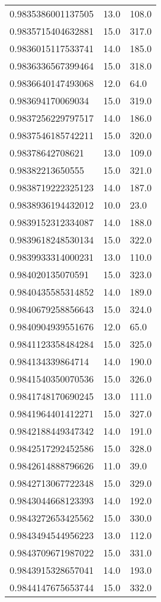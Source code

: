 \begin{center}
\begin{supertabular}[H]{p{0.30\textwidth}p{0.05\textwidth}p{0.05\textwidth}}
0.9835386001137505 & 13.0 & 108.0 \\ 
0.9835715404632881 & 15.0 & 317.0 \\ 
0.9836015117533741 & 14.0 & 185.0 \\ 
0.9836336567399464 & 15.0 & 318.0 \\ 
0.9836640147493068 & 12.0 & 64.0 \\ 
0.983694170069034 & 15.0 & 319.0 \\ 
0.9837256229797517 & 14.0 & 186.0 \\ 
0.9837546185742211 & 15.0 & 320.0 \\ 
0.98378642708621 & 13.0 & 109.0 \\ 
0.98382213650555 & 15.0 & 321.0 \\ 
0.9838719222325123 & 14.0 & 187.0 \\ 
0.9838936194432012 & 10.0 & 23.0 \\ 
0.9839152312334087 & 14.0 & 188.0 \\ 
0.9839618248530134 & 15.0 & 322.0 \\ 
0.9839933314000231 & 13.0 & 110.0 \\ 
0.984020135070591 & 15.0 & 323.0 \\ 
0.9840435585314852 & 14.0 & 189.0 \\ 
0.9840679258856643 & 15.0 & 324.0 \\ 
0.9840904939551676 & 12.0 & 65.0 \\ 
0.9841123358484284 & 15.0 & 325.0 \\ 
0.984134339864714 & 14.0 & 190.0 \\ 
0.9841540350070536 & 15.0 & 326.0 \\ 
0.9841748170690245 & 13.0 & 111.0 \\ 
0.9841964401412271 & 15.0 & 327.0 \\ 
0.9842188449347342 & 14.0 & 191.0 \\ 
0.9842517292452586 & 15.0 & 328.0 \\ 
0.9842614888796626 & 11.0 & 39.0 \\ 
0.9842713067722348 & 15.0 & 329.0 \\ 
0.9843044668123393 & 14.0 & 192.0 \\ 
0.9843272653425562 & 15.0 & 330.0 \\ 
0.9843494544956223 & 13.0 & 112.0 \\ 
0.9843709671987022 & 15.0 & 331.0 \\ 
0.9843915328657041 & 14.0 & 193.0 \\ 
0.9844147675653744 & 15.0 & 332.0 \\ 

\end{supertabular}
\end{center}
